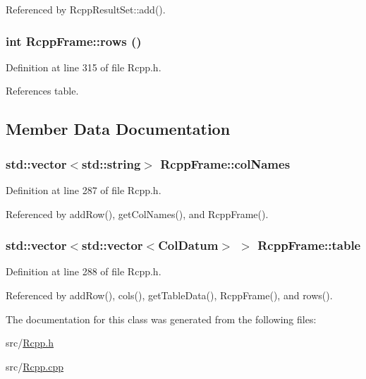 Referenced by RcppResultSet::add().\hypertarget{classRcppFrame_a33ab9553bb9fa510c338a3e092d9ace}{
\subsubsection[{rows}]{\setlength{\rightskip}{0pt plus 5cm}int RcppFrame::rows ()}}
\label{classRcppFrame_a33ab9553bb9fa510c338a3e092d9ace}




Definition at line 315 of file Rcpp.h.

References table.

\subsection{Member Data Documentation}
\hypertarget{classRcppFrame_9b549d377248896848b6abcb8df64f82}{
\subsubsection[{colNames}]{\setlength{\rightskip}{0pt plus 5cm}std::vector$<$std::string$>$ {\bf RcppFrame::colNames}}}
\label{classRcppFrame_9b549d377248896848b6abcb8df64f82}




Definition at line 287 of file Rcpp.h.

Referenced by addRow(), getColNames(), and RcppFrame().\hypertarget{classRcppFrame_4de0bda5c0df650b2447a4c029af0302}{
\subsubsection[{table}]{\setlength{\rightskip}{0pt plus 5cm}std::vector$<$std::vector$<${\bf ColDatum}$>$ $>$ {\bf RcppFrame::table}}}
\label{classRcppFrame_4de0bda5c0df650b2447a4c029af0302}




Definition at line 288 of file Rcpp.h.

Referenced by addRow(), cols(), getTableData(), RcppFrame(), and rows().

The documentation for this class was generated from the following files:\begin{CompactItemize}
\item 
src/\hyperlink{Rcpp_8h}{Rcpp.h}\item 
src/\hyperlink{Rcpp_8cpp}{Rcpp.cpp}\end{CompactItemize}
